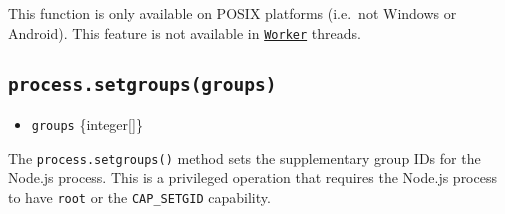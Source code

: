 \begin{Shaded}
\begin{Highlighting}[]
  \OperatorTok{=} \NormalTok{(}\NormalTok{)}\OperatorTok{;}

\NormalTok{ (} \OperatorTok{\&\&} \NormalTok{) \{}
  \NormalTok{(}\SpecialCharTok{$\{}\NormalTok{()}\SpecialCharTok{\}}\VerbatimStringTok{\textasciigrave{}}\NormalTok{)}\OperatorTok{;}
  \NormalTok{ \{}
    \NormalTok{(}\NormalTok{)}\OperatorTok{;}
    \NormalTok{(}\SpecialCharTok{$\{}\NormalTok{()}\SpecialCharTok{\}}\VerbatimStringTok{\textasciigrave{}}\NormalTok{)}\OperatorTok{;}
\NormalTok{  \} }
    \NormalTok{(}\SpecialCharTok{$\{}\SpecialCharTok{\}}\VerbatimStringTok{\textasciigrave{}}\NormalTok{)}\OperatorTok{;}
\NormalTok{  \}}
\NormalTok{\}}
\end{Highlighting}
\end{Shaded}

This function is only available on POSIX platforms (i.e.~not Windows or
Android). This feature is not available in
\href{worker_threads.md\#class-worker}{\texttt{Worker}} threads.

\subsection{\texorpdfstring{\texttt{process.setgroups(groups)}}{process.setgroups(groups)}}\label{process.setgroupsgroups}

\begin{itemize}
\tightlist
\item
  \texttt{groups} \{integer{[}{]}\}
\end{itemize}

The \texttt{process.setgroups()} method sets the supplementary group IDs
for the Node.js process. This is a privileged operation that requires
the Node.js process to have \texttt{root} or the \texttt{CAP\_SETGID}
capability.

